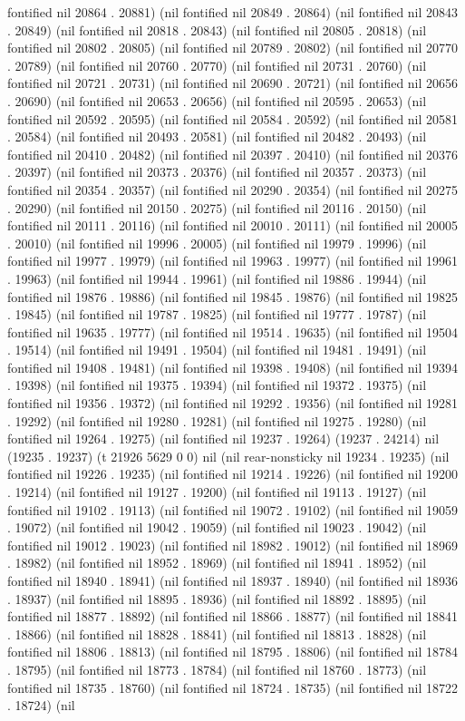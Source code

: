 fontified nil 20864 . 20881) (nil fontified nil 20849 . 20864) (nil fontified nil 20843 . 20849) (nil fontified nil 20818 . 20843) (nil fontified nil 20805 . 20818) (nil fontified nil 20802 . 20805) (nil fontified nil 20789 . 20802) (nil fontified nil 20770 . 20789) (nil fontified nil 20760 . 20770) (nil fontified nil 20731 . 20760) (nil fontified nil 20721 . 20731) (nil fontified nil 20690 . 20721) (nil fontified nil 20656 . 20690) (nil fontified nil 20653 . 20656) (nil fontified nil 20595 . 20653) (nil fontified nil 20592 . 20595) (nil fontified nil 20584 . 20592) (nil fontified nil 20581 . 20584) (nil fontified nil 20493 . 20581) (nil fontified nil 20482 . 20493) (nil fontified nil 20410 . 20482) (nil fontified nil 20397 . 20410) (nil fontified nil 20376 . 20397) (nil fontified nil 20373 . 20376) (nil fontified nil 20357 . 20373) (nil fontified nil 20354 . 20357) (nil fontified nil 20290 . 20354) (nil fontified nil 20275 . 20290) (nil fontified nil 20150 . 20275) (nil fontified nil 20116 . 20150) (nil fontified nil 20111 . 20116) (nil fontified nil 20010 . 20111) (nil fontified nil 20005 . 20010) (nil fontified nil 19996 . 20005) (nil fontified nil 19979 . 19996) (nil fontified nil 19977 . 19979) (nil fontified nil 19963 . 19977) (nil fontified nil 19961 . 19963) (nil fontified nil 19944 . 19961) (nil fontified nil 19886 . 19944) (nil fontified nil 19876 . 19886) (nil fontified nil 19845 . 19876) (nil fontified nil 19825 . 19845) (nil fontified nil 19787 . 19825) (nil fontified nil 19777 . 19787) (nil fontified nil 19635 . 19777) (nil fontified nil 19514 . 19635) (nil fontified nil 19504 . 19514) (nil fontified nil 19491 . 19504) (nil fontified nil 19481 . 19491) (nil fontified nil 19408 . 19481) (nil fontified nil 19398 . 19408) (nil fontified nil 19394 . 19398) (nil fontified nil 19375 . 19394) (nil fontified nil 19372 . 19375) (nil fontified nil 19356 . 19372) (nil fontified nil 19292 . 19356) (nil fontified nil 19281 . 19292) (nil fontified nil 19280 . 19281) (nil fontified nil 19275 . 19280) (nil fontified nil 19264 . 19275) (nil fontified nil 19237 . 19264) (19237 . 24214) nil (19235 . 19237) (t 21926 5629 0 0) nil (nil rear-nonsticky nil 19234 . 19235) (nil fontified nil 19226 . 19235) (nil fontified nil 19214 . 19226) (nil fontified nil 19200 . 19214) (nil fontified nil 19127 . 19200) (nil fontified nil 19113 . 19127) (nil fontified nil 19102 . 19113) (nil fontified nil 19072 . 19102) (nil fontified nil 19059 . 19072) (nil fontified nil 19042 . 19059) (nil fontified nil 19023 . 19042) (nil fontified nil 19012 . 19023) (nil fontified nil 18982 . 19012) (nil fontified nil 18969 . 18982) (nil fontified nil 18952 . 18969) (nil fontified nil 18941 . 18952) (nil fontified nil 18940 . 18941) (nil fontified nil 18937 . 18940) (nil fontified nil 18936 . 18937) (nil fontified nil 18895 . 18936) (nil fontified nil 18892 . 18895) (nil fontified nil 18877 . 18892) (nil fontified nil 18866 . 18877) (nil fontified nil 18841 . 18866) (nil fontified nil 18828 . 18841) (nil fontified nil 18813 . 18828) (nil fontified nil 18806 . 18813) (nil fontified nil 18795 . 18806) (nil fontified nil 18784 . 18795) (nil fontified nil 18773 . 18784) (nil fontified nil 18760 . 18773) (nil fontified nil 18735 . 18760) (nil fontified nil 18724 . 18735) (nil fontified nil 18722 . 18724) (nil 